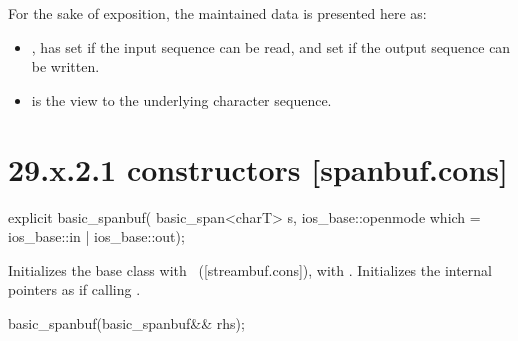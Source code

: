 \documentclass[ebook,11pt,article]{memoir}
\renewcommand{\iref}[1]{[#1]}
\begin{document}
\pnum
For the sake of exposition, the maintained data is presented here as:
\begin{itemize}
\item
{},
has
set if the input sequence can be read, and
set if the output sequence can be written.
\item
{}
is the view to the underlying character sequence.
\end{itemize}

\section{29.x.2.1  constructors [spanbuf.cons]}

%
\begin{itemdecl}
explicit basic_spanbuf(
  basic_span<charT> s,
  ios_base::openmode which = ios_base::in | ios_base::out);
\end{itemdecl}

\begin{itemdescr}
\pnum
\effects
Initializes the base class with
~(\iref{streambuf.cons}),
with . 
Initializes the internal pointers as if calling .
\end{itemdescr}

%
\begin{itemdecl}
basic_spanbuf(basic_spanbuf&& rhs);
\end{itemdecl}
\end{document}
